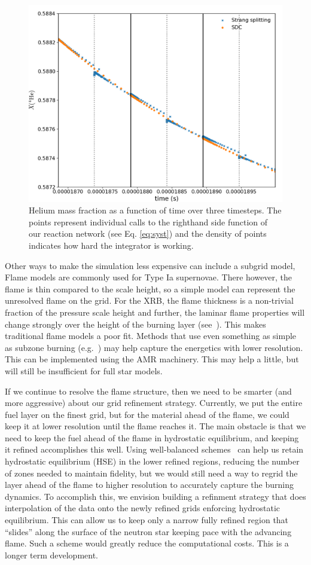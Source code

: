 \documentclass[a4paper]{jpconf}
\begin{document}
\begin{figure}
\centering
\includegraphics[width=0.75\linewidth]{sdc_plot}
\caption{\label{fig:sdc} Helium mass fraction as a function of time
  over three timesteps.  The points represent individual calls to the
  righthand side function of our reaction network (see
  Eq. \ref{eq:syst}) and the density of points indicates how hard the
  integrator is working.}
\end{figure}

Other ways to make the simulation less expensive can include a subgrid
model, Flame models are commonly used for Type Ia supernovae.  There
however, the flame is thin compared to the scale height, so a simple
model can represent the unresolved flame on the grid.  For the XRB,
the flame thickness is a non-trivial fraction of the pressure scale
height and further, the laminar flame properties will change strongly
over the height of the burning layer (see~\cite{Timmes00}).  This
makes traditional flame models a poor fit.  Methods that use even
something as simple as subzone burning (e.g.~\cite{Wang2012190}) may
help capture the energetics with lower resolution.  This can be
implemented using the AMR machinery.  This may help a little, but will
still be insufficient for full star models.

If we continue to resolve the flame structure, then we need to be
smarter (and more aggressive) about our grid refinement strategy.
Currently, we put the entire fuel layer on the finest grid, but for
the material ahead of the flame, we could keep it at lower resolution
until the flame reaches it.  The main obstacle is that we need to keep
the fuel ahead of the flame in hydrostatic equilibrium, and keeping it
refined accomplishes this well.  Using well-balanced
schemes~\cite{kappeli:2016} can help us retain hydrostatic equilibrium
(HSE) in the lower refined regions, reducing the number of zones
needed to maintain fidelity, but we would still need a way to regrid
the layer ahead of the flame to higher resolution to accurately
capture the burning dynamics.  To accomplish this, we envision
building a refinment strategy that does interpolation of the data onto
the newly refined grids enforcing hydrostatic equilibrium.  This can
allow us to keep only a narrow fully refined region that ``slides''
along the surface of the neutron star keeping pace with the advancing
flame.  Such a scheme would greatly reduce the computational costs.
This is a longer term development.
\end{document}
